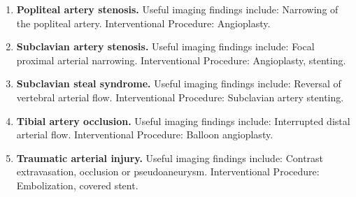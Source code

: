\begin{enumerate}[leftmargin=*,itemsep=0.45em,topsep=0.4em]
\item \textbf{Popliteal artery stenosis.} Useful imaging findings include: Narrowing of the popliteal artery. Interventional Procedure: Angioplasty.
\item \textbf{Subclavian artery stenosis.} Useful imaging findings include: Focal proximal arterial narrowing. Interventional Procedure: Angioplasty, stenting.
\item \textbf{Subclavian steal syndrome.} Useful imaging findings include: Reversal of vertebral arterial flow. Interventional Procedure: Subclavian artery stenting.
\item \textbf{Tibial artery occlusion.} Useful imaging findings include: Interrupted distal arterial flow. Interventional Procedure: Balloon angioplasty.
\item \textbf{Traumatic arterial injury.} Useful imaging findings include: Contrast extravasation, occlusion or pseudoaneurysm. Interventional Procedure: Embolization, covered stent.
\end{enumerate}

